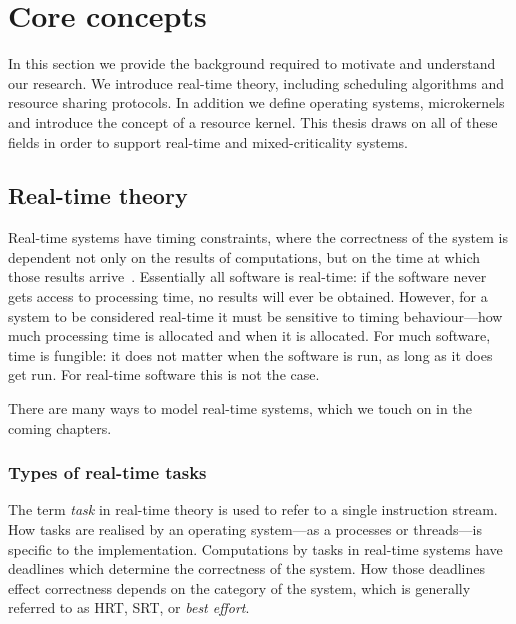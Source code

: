 




\chapter{Core concepts}
\label{chap:background}

In this section we provide the background required to motivate and understand our research.
We introduce real-time theory, including scheduling algorithms and resource sharing protocols.
In addition we define operating systems, microkernels and introduce the concept of a resource kernel.
This thesis draws on all of these fields in order to support real-time and mixed-criticality systems.

\section{Real-time theory}
\label{sec:real-time-theory}

Real-time systems have timing constraints, where the correctness of the system is dependent not only
on the results of computations, but on the time at which those results
arrive~\citep{Stankovic_88}.  Essentially all software is real-time: if the software never gets
access to processing time, no results will ever be obtained.  However, for a system
to be considered real-time it must be sensitive to timing behaviour---how much processing time is
allocated and when it is allocated. For much software, time is
fungible: it does not matter when the software is run, as long as it does get run. For 
real-time software this is not the case.

There are many ways to model real-time systems, which we touch on in the coming chapters. 

\subsection{Types of real-time tasks}

The term \emph{task} in real-time theory is used to refer to a single instruction stream.  How tasks
are realised by an operating system---as a processes or threads---is specific to the
implementation.  Computations by tasks in real-time systems have deadlines which determine the
correctness of the system. How those deadlines effect correctness depends on the category of the
system, which is generally referred to as \gls{HRT}, \gls{SRT}, or \emph{best effort}.

